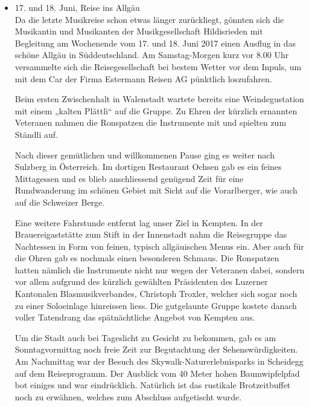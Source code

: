\begin{history}
\begin{itemize}
            \item 17. und 18. Juni, Reise ins Allgäu\\
                  Da die letzte Musikreise schon etwas länger zurückliegt, gönnten
                  sich die Musikantin und Musikanten der Musikgesellschaft
                  Hildisrieden mit Begleitung am Wochenende vom 17. und 18. Juni
                  2017 einen Ausflug in das schöne Allgäu in Süddeutschland. Am
                  Samstag-Morgen kurz vor 8.00 Uhr versammelte sich die
                  Reisegesellschaft bei bestem Wetter vor dem Inpuls, um mit dem Car
                  der Firma Estermann Reisen AG pünktlich loszufahren.

                  Beim ersten Zwischenhalt in Walenstadt wartete bereits eine
                  Weindegustation mit einem „kalten Plättli“ auf die Gruppe. Zu
                  Ehren der kürzlich ernannten Veteranen nahmen die Ronspatzen die
                  Instrumente mit und spielten zum Ständli auf.

                  Nach dieser gemütlichen und willkommenen Pause ging es weiter nach
                  Sulzberg in Österreich. Im dortigen Restaurant Ochsen gab es ein
                  feines Mittagessen und es blieb anschliessend genügend Zeit für
                  eine Rundwanderung im schönen Gebiet mit Sicht auf die
                  Vorarlberger, wie auch auf die Schweizer Berge.

                  Eine weitere Fahrstunde entfernt lag unser Ziel in Kempten. In der
                  Brauereigaststätte zum Stift in der Innenstadt nahm die
                  Reisegruppe das Nachtessen in Form von feinen, typisch
                  allgäuischen Menus ein. Aber auch für die Ohren gab es nochmals
                  einen besonderen Schmaus. Die Ronspatzen hatten nämlich die
                  Instrumente nicht nur wegen der Veteranen dabei, sondern vor allem
                  aufgrund des kürzlich gewählten Präsidenten des Luzerner
                  Kantonalen Blasmusikverbandes, Christoph Troxler, welcher sich
                  sogar noch zu einer Soloeinlage hinreissen liess. Die gutgelaunte
                  Gruppe kostete danach voller Tatendrang das spätnächtliche Angebot
                  von Kempten aus.

                  Um die Stadt auch bei Tageslicht zu Gesicht zu bekommen, gab es am
                  Sonntagvormittag noch freie Zeit zur Begutachtung der
                  Sehenswürdigkeiten. Am Nachmittag war der Besuch des
                  Skywalk-Naturerlebnisparks in Scheidegg auf dem Reiseprogramm. Der
                  Ausblick vom 40 Meter hohen Baumwipfelpfad bot einiges und war
                  eindrücklich. Natürlich ist das rustikale Brotzeitbuffet noch zu
                  erwähnen, welches zum Abschluss aufgetischt wurde.


\end{itemize}
\end{history}
